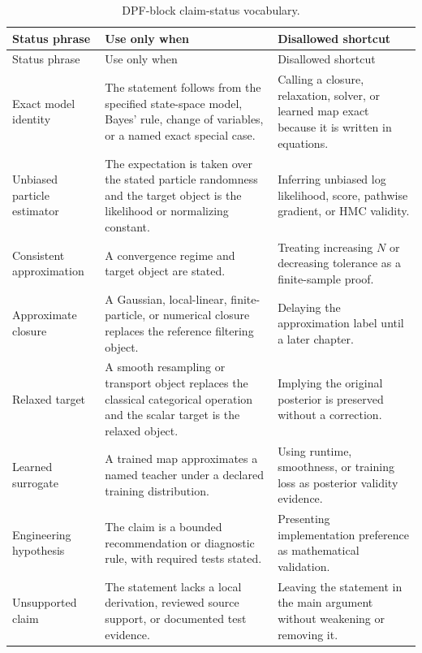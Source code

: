 \begin{center}
\scriptsize
\begin{longtable}{@{}p{} p{} p{}@{}}
\caption{DPF-block claim-status vocabulary.}
\label{tab:bf-dpf-claim-status-index}\\
\toprule
Status phrase & Use only when & Disallowed shortcut \\
\midrule
\endfirsthead
\toprule
Status phrase & Use only when & Disallowed shortcut \\
\midrule
\endhead
Exact model identity &
The statement follows from the specified state-space model, Bayes' rule,
change of variables, or a named exact special case. &
Calling a closure, relaxation, solver, or learned map exact because it is
written in equations. \\
Unbiased particle estimator &
The expectation is taken over the stated particle randomness and the target
object is the likelihood or normalizing constant. &
Inferring unbiased log likelihood, score, pathwise gradient, or HMC validity. \\
Consistent approximation &
A convergence regime and target object are stated. &
Treating increasing $N$ or decreasing tolerance as a finite-sample proof. \\
Approximate closure &
A Gaussian, local-linear, finite-particle, or numerical closure replaces the
reference filtering object. &
Delaying the approximation label until a later chapter. \\
Relaxed target &
A smooth resampling or transport object replaces the classical categorical
operation and the scalar target is the relaxed object. &
Implying the original posterior is preserved without a correction. \\
Learned surrogate &
A trained map approximates a named teacher under a declared training
distribution. &
Using runtime, smoothness, or training loss as posterior validity evidence. \\
Engineering hypothesis &
The claim is a bounded recommendation or diagnostic rule, with required tests
stated. &
Presenting implementation preference as mathematical validation. \\
Unsupported claim &
The statement lacks a local derivation, reviewed source support, or documented
test evidence. &
Leaving the statement in the main argument without weakening or removing it. \\
\bottomrule
\end{longtable}
\end{center}

